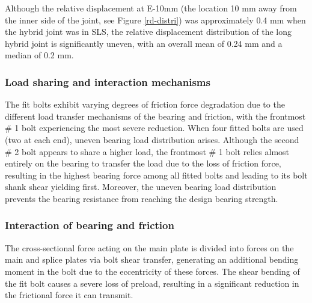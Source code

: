 Although the relative displacement at E-10mm (the location 10 mm away from the inner side of the joint, see Figure \ref{rd-distri}) was approximately 0.4 mm when the hybrid joint was in SLS, the relative displacement distribution of the long hybrid joint is significantly uneven, with an overall mean of 0.24 mm and a median of 0.2 mm.
    

\subsubsection*{Load sharing and interaction mechanisms}

The fit bolts exhibit varying degrees of friction force degradation due to the different load transfer mechanisms of the bearing and friction, with the frontmost \# 1 bolt experiencing the most severe reduction. When four fitted bolts are used (two at each end), uneven bearing load distribution arises. Although the second \# 2 bolt appears to share a higher load, the frontmost \# 1 bolt relies almost entirely on the bearing to transfer the load due to the loss of friction force, resulting in the highest bearing force among all fitted bolts and leading to its bolt shank shear yielding first. Moreover, the uneven bearing load distribution prevents the bearing resistance from reaching the design bearing strength.



\subsubsection*{Interaction of bearing and friction}

The cross-sectional force acting on the main plate is divided into forces on the main and splice plates via bolt shear transfer, generating an additional bending moment in the bolt due to the eccentricity of these forces. The shear bending of the fit bolt causes a severe loss of preload, resulting in a significant reduction in the frictional force it can transmit.

